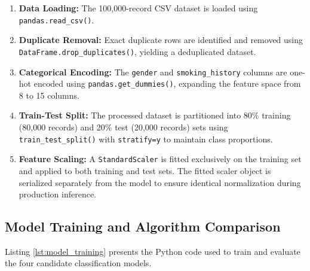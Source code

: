 \documentclass[12pt,a4paper]{report}
\begin{document}
\begin{enumerate}
    \item \textbf{Data Loading:} The 100,000-record CSV dataset is loaded using \texttt{pandas.read\_csv()}.
    \item \textbf{Duplicate Removal:} Exact duplicate rows are identified and removed using \texttt{DataFrame.drop\_duplicates()}, yielding a deduplicated dataset.
    \item \textbf{Categorical Encoding:} The \texttt{gender} and \texttt{smoking\_history} columns are one-hot encoded using \texttt{pandas.get\_dummies()}, expanding the feature space from 8 to 15 columns.
    \item \textbf{Train-Test Split:} The processed dataset is partitioned into 80\% training (80,000 records) and 20\% test (20,000 records) sets using \texttt{train\_test\_split()} with \texttt{stratify=y} to maintain class proportions.
    \item \textbf{Feature Scaling:} A \texttt{StandardScaler} is fitted exclusively on the training set and applied to both training and test sets. The fitted scaler object is serialized separately from the model to ensure identical normalization during production inference.
\end{enumerate}

\subsection{Model Training and Algorithm Comparison}
Listing \ref{lst:model_training} presents the Python code used to train and evaluate the four candidate classification models.
\end{document}
